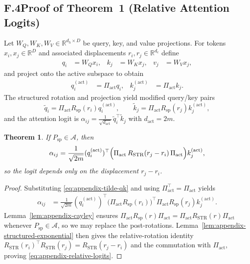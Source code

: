 \documentclass[11pt]{article}
\newcommand{\Real}{\mathbb{R}}
\newtheorem{theorem}{Theorem}
\begin{document}
\subsection*{F.4\quad Proof of Theorem~1 (Relative Attention Logits)}

Let $W_Q,W_K,W_V \in \Real^{d_h\times D}$ be query, key, and value projections.  For tokens
$x_i,x_j\in\Real^{D}$ and associated displacements $r_i,r_j\in\Real^{d_c}$ define
\begin{align}
  q_i &= W_Q x_i,
  &
  k_j &= W_K x_j,
  &
  v_j &= W_V x_j,
\end{align}
and project onto the active subspace to obtain
\begin{align}
  q_i^{(\mathrm{act})} &= \Pi_{\mathrm{act}} q_i,
  &
  k_j^{(\mathrm{act})} &= \Pi_{\mathrm{act}} k_j.
\end{align}
The structured rotation and projection yield modified query/key pairs
\begin{equation}
  \tilde q_i = \Pi_{\mathrm{act}} R_{\mathrm{sp}}(r_i) q_i^{(\mathrm{act})},
  \qquad
  \tilde k_j = \Pi_{\mathrm{act}} R_{\mathrm{sp}}(r_j) k_j^{(\mathrm{act})},
  \label{eq:appendix-tilde-qk}
\end{equation}
and the attention logit is $\alpha_{ij} = \tfrac{1}{\sqrt{d_{\mathrm{act}}}}\,\tilde q_i^\top \tilde k_j$ with
$d_{\mathrm{act}} = 2m$.

\begin{theorem}\label{thm:appendix-relative-logits}
If $P_{\mathrm{sp}}\in\mathcal{A}$, then
\begin{equation}
  \alpha_{ij}
  = \frac{1}{\sqrt{2m}}
    (q_i^{(\mathrm{act})})^\top
    \Bigl(\Pi_{\mathrm{act}}\,R_{\mathrm{STR}}(r_j - r_i)\,\Pi_{\mathrm{act}}\Bigr)
    k_j^{(\mathrm{act})},
  \label{eq:appendix-relative-logits}
\end{equation}
so the logit depends only on the displacement $r_j - r_i$.
\end{theorem}

\begin{proof}
Substituting \eqref{eq:appendix-tilde-qk} and using $\Pi_{\mathrm{act}}^\top = \Pi_{\mathrm{act}}$ yields
\begin{align}
  \alpha_{ij}
  &= \frac{1}{\sqrt{2m}}
     (q_i^{(\mathrm{act})})^\top
     \bigl(\Pi_{\mathrm{act}} R_{\mathrm{sp}}(r_i)\bigr)^\top
     \Pi_{\mathrm{act}} R_{\mathrm{sp}}(r_j)
     k_j^{(\mathrm{act})}.
\end{align}
Lemma~\ref{lem:appendix-cayley} ensures $\Pi_{\mathrm{act}} R_{\mathrm{sp}}(r) \Pi_{\mathrm{act}} =
\Pi_{\mathrm{act}} R_{\mathrm{STR}}(r) \Pi_{\mathrm{act}}$ whenever $P_{\mathrm{sp}}\in\mathcal{A}$, so we may replace
the post-rotations.  Lemma~\ref{lem:appendix-structured-exponential} then gives the relative-rotation identity
$R_{\mathrm{STR}}(r_i)^\top R_{\mathrm{STR}}(r_j) = R_{\mathrm{STR}}(r_j - r_i)$ and the commutation
with $\Pi_{\mathrm{act}}$, proving \eqref{eq:appendix-relative-logits}.
\end{proof}
\end{document}
